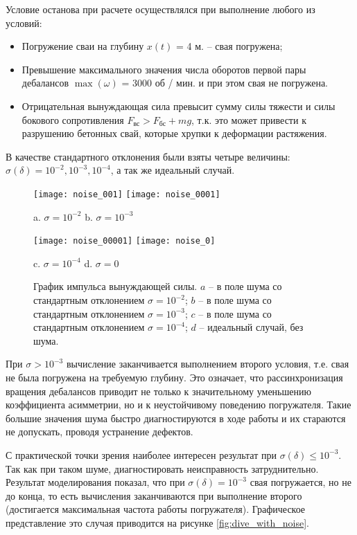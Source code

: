 Условие останова при расчете осуществлялся при выполнение любого из условий:
\begin{itemize}
    \item Погружение сваи на глубину $x(t)$ = 4 м. -- свая погружена;
    \item Превышение максимального значения числа оборотов первой пары дебалансов $\max(\omega)$ = 3000 об / мин.
    и при этом свая не погружена.
    \item Отрицательная вынуждающая сила превысит сумму силы тяжести и силы бокового сопротивления $F_\text{вс} > F_\text{бс} + mg $,
    т.к. это может привести к разрушению бетонных свай, которые хрупки к деформации растяжения.
\end{itemize}
В качестве стандартного отклонения были взяты четыре величины: $\sigma(\delta) = 10^{-2}, 10^{-3}, 10^{-4}$, а так же идеальный случай.

\begin{figure}[ht]
    \centering
    \texttt{[image: noise\_001]}
    \texttt{[image: noise\_0001]}

    a. $\sigma = 10^{-2}$ \hspace{5cm} b. $\sigma = 10^{-3}$

    \texttt{[image: noise\_00001]}
    \texttt{[image: noise\_0]}

    c. $\sigma = 10^{-4}$ \hspace{5cm} d. $\sigma = 0$
    \caption{График импульса вынуждающей силы.
    $a$ -- в поле шума со стандартным отклонением $\sigma = 10^{-2}$;
    $b$ -- в поле шума со стандартным отклонением $\sigma = 10^{-3}$;
    $c$ -- в поле шума со стандартным отклонением $\sigma = 10^{-4}$;
    $d$ -- идеальный случай, без шума.}
    \label{fig:impulse-noise}
\end{figure}

При $\sigma > 10^{-3}$ вычисление заканчивается выполнением второго условия, т.е. свая не была погружена на требуемую глубину.
Это означает, что рассинхронизация вращения дебалансов приводит не только к значительному уменьшению коэффициента асимметрии,
но и к неустойчивому поведению погружателя. Такие большие значения шума быстро диагностируются в ходе работы и их стараются не
допускать, проводя устранение дефектов.

С практической точки зрения наиболее интересен результат при $\sigma(\delta) \leq 10^{-3}$. Так как при таком шуме, диагностировать
неисправность затруднительно. Результат моделирования показал, что при $\sigma(\delta) = 10^{-3}$ свая погружается, но не до конца,
то есть вычисления заканчиваются при выполнение второго (достигается максимальная частота работы погружателя). Графическое представление
это случая приводится на рисунке \ref{fig:dive_with_noise}.

